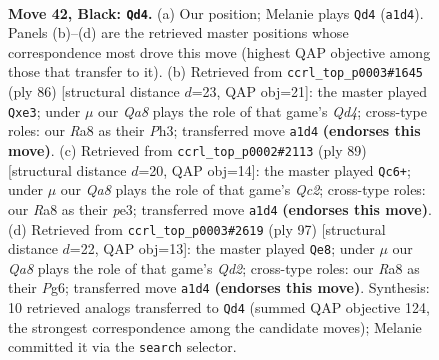 \documentclass[11pt]{article}
\begin{document}
\clearpage

\begin{figure}[p]\centering
\begin{subfigure}{0.46\textwidth}\centering
\resizebox{\linewidth}{!}{%
\newchessgame
\chessboard[
  setfen={r7/5k2/5p2/3p4/5P2/p5P1/P3Q1KP/q7 b - - 4 42},
  showmover=false,
  pgfstyle=straightmove, color=movearrow, markmove={a1-d4}
]}
\caption{}
\end{subfigure}\hfill
\begin{subfigure}{0.46\textwidth}\centering
\resizebox{\linewidth}{!}{%
\newchessgame
\chessboard[
  setfen={1q4k1/5p1p/6p1/8/P2Q4/4p2P/1P4P1/6K1 w - - 0 44},
  showmover=false,
  pgfstyle=straightmove, color=movearrow, markmove={d4-e3}
]}
\caption{}
\end{subfigure}
\\[4pt]
\begin{subfigure}{0.46\textwidth}\centering
\resizebox{\linewidth}{!}{%
\newchessgame
\chessboard[
  setfen={6k1/2q2p2/p3p1p1/P7/1Q4P1/4P3/5PK1/8 b - - 0 45},
  showmover=false,
  pgfstyle=straightmove, color=movearrow, markmove={c7-c6}
]}
\caption{}
\end{subfigure}\hfill
\begin{subfigure}{0.46\textwidth}\centering
\resizebox{\linewidth}{!}{%
\newchessgame
\chessboard[
  setfen={5k2/3q2p1/1p4p1/8/P1Q3Pp/7P/1P3PK1/8 b - - 0 49},
  showmover=false,
  pgfstyle=straightmove, color=movearrow, markmove={d7-e8}
]}
\caption{}
\end{subfigure}
\caption{\textbf{Move 42, Black: \texttt{Qd4}.} (a) Our position; Melanie plays \texttt{Qd4} (\texttt{a1d4}). Panels (b)--(d) are the retrieved master positions whose correspondence most drove this move (highest QAP objective among those that transfer to it). (b) Retrieved from \texttt{ccrl\_top\_p0003\#1645} (ply 86) [structural distance $d$=23, QAP obj=21]: the master played \texttt{Qxe3}; under $\mu$ our \emph{Qa8} plays the role of that game's \emph{Qd4}; cross-type roles: our \emph{R}a8 as their \emph{P}h3; transferred move \texttt{a1d4} \textbf{(endorses this move)}. (c) Retrieved from \texttt{ccrl\_top\_p0002\#2113} (ply 89) [structural distance $d$=20, QAP obj=14]: the master played \texttt{Qc6+}; under $\mu$ our \emph{Qa8} plays the role of that game's \emph{Qc2}; cross-type roles: our \emph{R}a8 as their \emph{p}e3; transferred move \texttt{a1d4} \textbf{(endorses this move)}. (d) Retrieved from \texttt{ccrl\_top\_p0003\#2619} (ply 97) [structural distance $d$=22, QAP obj=13]: the master played \texttt{Qe8}; under $\mu$ our \emph{Qa8} plays the role of that game's \emph{Qd2}; cross-type roles: our \emph{R}a8 as their \emph{P}g6; transferred move \texttt{a1d4} \textbf{(endorses this move)}. Synthesis: 10 retrieved analogs transferred to \texttt{Qd4} (summed QAP objective 124, the strongest correspondence among the candidate moves); Melanie committed it via the \texttt{search} selector.}
\label{fig:thought-m83}
\end{figure}
\end{document}
